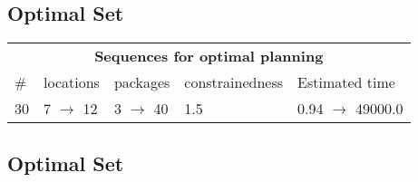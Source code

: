 \documentclass{article}
\begin{document}
                            \subsection*{Optimal Set}

                            \begin{center}
                            \begin{tabular}{l|l|l|l|l}
                            \multicolumn{5}{c}{\bf \large Sequences for optimal planning}\\
                            \# & locations & packages & constrainedness & Estimated time\\\midrule
                            30&7 $\rightarrow$ 12&3 $\rightarrow$ 40&1.5&0.94 $\rightarrow$ 49000.0
                            \end{tabular}
                            \end{center}
                    
                                \subsection*{Optimal Set}
                                
\end{document}
